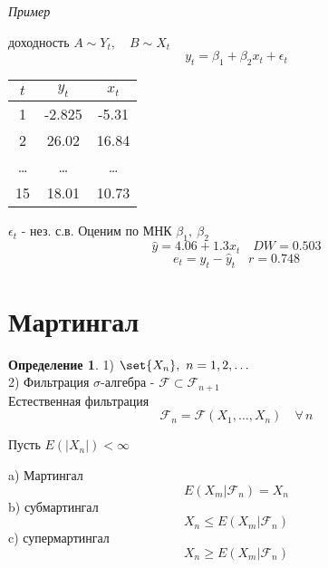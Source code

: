 \documentclass[a4paper]{article}
\DeclarePairedDelimiter\set\{\}
\theoremstyle{definition}
\newtheorem*{definition}{Определение}
\theoremstyle{remark}
\begin{document}
\emph{Пример}

доходность $ A \sim Y_t, \quad B \sim X_t $ 
\[
    y_t = \beta_1 + \beta_2 x_t + \epsilon_t
\]
\begin{center}
    \begin{tabular}{ |c|c|c| }
        \hline
        $t$ & $y_t$ & $x_t$\\
        \hline
        1 & -2.825 & -5.31 \\
        2 & 26.02 & 16.84\\
        \dots & \dots & \dots\\
        15 & 18.01 & 10.73\\
        \hline
    \end{tabular}
\end{center}

$ \epsilon_t $ - нез. с.в. Оценим по МНК $ \beta_1, \ \beta_2 $ 
\[
    \hat{y} = 4.06 + 1.3 x_t \quad DW = 0.503
\]
\[
    e_t = y_t - \hat{y}_t \quad r = 0.748
\]

\section*{\centering Мартингал}
\begin{tcolorbox}
\begin{definition}
    1) $ \set{X_n}, \ n = 1, 2, \dots $ \\
    2) Фильтрация $ \sigma\text{-алгебра - }\mathcal{F} \subset \mathcal{F}_{n+1} $ \\
    Естественная фильтрация
    \[
        \mathcal{F}_n = \mathcal{F}(X_1, \dots, X_n) \quad \forall\, n
    \]

    Пусть $ E(|X_n|) < \infty $ 

    a) Мартингал
    \[
        E(X_m | \mathcal{F}_n) = X_n
    \]
    b) субмартингал
    \[
        X_n \leq E(X_m | \mathcal{F}_n)
    \]
    c) супермартингал
    \[
        X_n \geq E(X_m | \mathcal{F}_n)
    \]
\end{definition}
\end{tcolorbox}
\end{document}
